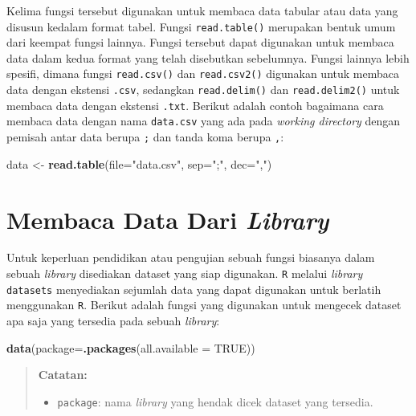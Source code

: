 \documentclass[]{book}
\newenvironment{Shaded}{\begin{snugshade}}{\end{snugshade}}
\newcommand{\DataTypeTok}[1]{\textcolor[rgb]{0.13,0.29,0.53}{#1}}
\newcommand{\KeywordTok}[1]{\textcolor[rgb]{0.13,0.29,0.53}{\textbf{#1}}}
\newcommand{\NormalTok}[1]{#1}
\newcommand{\OtherTok}[1]{\textcolor[rgb]{0.56,0.35,0.01}{#1}}
\newcommand{\StringTok}[1]{\textcolor[rgb]{0.31,0.60,0.02}{#1}}
\providecommand{\tightlist}{%
  \setlength{\itemsep}{0pt}\setlength{\parskip}{0pt}}
\theoremstyle{definition}
\theoremstyle{definition}
\theoremstyle{definition}
\theoremstyle{remark}
\begin{document}
Kelima fungsi tersebut digunakan untuk membaca data tabular atau data yang disusun kedalam format tabel. Fungsi \texttt{read.table()} merupakan bentuk umum dari keempat fungsi lainnya. Fungsi tersebut dapat digunakan untuk membaca data dalam kedua format yang telah disebutkan sebelumnya. Fungsi lainnya lebih spesifi, dimana fungsi \texttt{read.csv()} dan \texttt{read.csv2()} digunakan untuk membaca data dengan ekstensi \texttt{.csv}, sedangkan \texttt{read.delim()} dan \texttt{read.delim2()} untuk membaca data dengan ekstensi \texttt{.txt}. Berikut adalah contoh bagaimana cara membaca data dengan nama \texttt{data.csv} yang ada pada \emph{working directory} dengan pemisah antar data berupa \texttt{;} dan tanda koma berupa \texttt{,}:

\begin{Shaded}
\begin{Highlighting}[]
\NormalTok{data <-}\StringTok{ }\KeywordTok{read.table}\NormalTok{(}\DataTypeTok{file=}\StringTok{"data.csv"}\NormalTok{, }\DataTypeTok{sep=}\StringTok{";"}\NormalTok{, }\DataTypeTok{dec=}\StringTok{","}\NormalTok{)}
\end{Highlighting}
\end{Shaded}

\hypertarget{librarydata}{%
\section{\texorpdfstring{Membaca Data Dari \emph{Library}}{Membaca Data Dari Library}}\label{librarydata}}

Untuk keperluan pendidikan atau pengujian sebuah fungsi biasanya dalam sebuah \emph{library} disediakan dataset yang siap digunakan. \texttt{R} melalui \emph{library} \texttt{datasets} menyediakan sejumlah data yang dapat digunakan untuk berlatih menggunakan \texttt{R}. Berikut adalah fungsi yang digunakan untuk mengecek dataset apa saja yang tersedia pada sebuah \emph{library}:

\begin{Shaded}
\begin{Highlighting}[]
\KeywordTok{data}\NormalTok{(}\DataTypeTok{package=}\KeywordTok{.packages}\NormalTok{(}\DataTypeTok{all.available =} \OtherTok{TRUE}\NormalTok{))}
\end{Highlighting}
\end{Shaded}

\begin{quote}
\textbf{Catatan:}

\begin{itemize}
\tightlist
\item
  \texttt{package}: nama \emph{library} yang hendak dicek dataset yang tersedia.
\end{itemize}
\end{quote}
\end{document}
